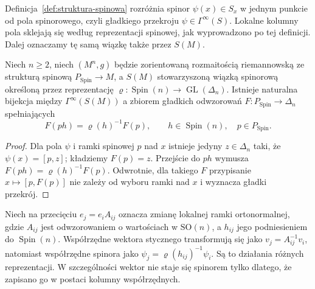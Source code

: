 Definicja~\ref{def:struktura-spinowa} rozróżnia spinor
$\psi(x)\in S_x$ w jednym punkcie od pola spinorowego,
czyli gładkiego przekroju $\psi\in\Gamma^\infty(S)$.
Lokalne kolumny pola sklejają się według reprezentacji
spinowej, jak wyprowadzono po tej definicji.
Dalej oznaczamy tę samą wiązkę także przez $S(M)$.
\begin{stwierdzenie}
\label{prop:pola-spinorowe-ekwiwariantnosc}
Niech $n\geq2$, niech $(M^n,g)$ będzie zorientowaną
rozmaitością riemannowską ze strukturą spinową
$P_{\mathrm{Spin}}\to M$, a $S(M)$ stowarzyszoną
wiązką spinorową określoną przez reprezentację
$\varrho:\operatorname{Spin}(n)\to\operatorname{GL}(\Delta_n)$.
Istnieje naturalna bijekcja między
$\Gamma^\infty(S(M))$ a zbiorem gładkich odwzorowań
$F:P_{\mathrm{Spin}}\to\Delta_n$ spełniających
\begin{equation}\label{eq:pola-spinorowe-ekwiwariantnosc}
 F(ph)=\varrho(h)^{-1}F(p),\qquad
 h\in\operatorname{Spin}(n),\quad p\in P_{\mathrm{Spin}}.
\end{equation}
\end{stwierdzenie}
\begin{proof}
Dla pola $\psi$ i ramki spinowej $p$ nad $x$ istnieje
jedyny $z\in\Delta_n$ taki, że $\psi(x)=[p,z]$;
kładziemy $F(p)=z$. Przejście do $ph$ wymusza
$F(ph)=\varrho(h)^{-1}F(p)$. Odwrotnie, dla takiego $F$
przypisanie $x\mapsto[p,F(p)]$ nie zależy od wyboru
ramki nad $x$ i wyznacza gładki przekrój.
\end{proof}

\begin{uwaga}
\label{rem:pola-spinorowe-ramki}
Niech na przecięciu $e_j=e_i A_{ij}$ oznacza zmianę
lokalnej ramki ortonormalnej, gdzie $A_{ij}$ jest
odwzorowaniem o wartościach w $\mathrm{SO}(n)$,
a $h_{ij}$ jego podniesieniem do $\operatorname{Spin}(n)$.
Współrzędne wektora stycznego transformują się jako
$v_j=A_{ij}^{-1}v_i$, natomiast współrzędne spinora
jako $\psi_j=\varrho(h_{ij})^{-1}\psi_i$.
Są to działania różnych reprezentacji. W szczególności
wektor nie staje się spinorem tylko dlatego, że zapisano go
w postaci kolumny współrzędnych.
\end{uwaga}

